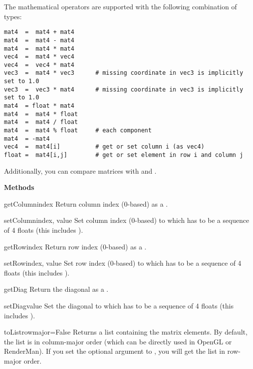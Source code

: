 The mathematical operators are supported with the following
combination of types:

\begin{verbatim}
mat4  =  mat4 + mat4
mat4  =  mat4 - mat4
mat4  =  mat4 * mat4
vec4  =  mat4 * vec4
vec4  =  vec4 * mat4
vec3  =  mat4 * vec3      # missing coordinate in vec3 is implicitly set to 1.0
vec3  =  vec3 * mat4      # missing coordinate in vec3 is implicitly set to 1.0
mat4  = float * mat4
mat4  =  mat4 * float
mat4  =  mat4 / float
mat4  =  mat4 % float     # each component
mat4  = -mat4
vec4  =  mat4[i]          # get or set column i (as vec4)
float =  mat4[i,j]        # get or set element in row i and column j
\end{verbatim}

Additionally, you can compare matrices with \code{==} and \code{!=}.

{\bf Methods}

\begin{methoddesc}{getColumn}{index}
Return column index (0-based) as a .
\end{methoddesc}

\begin{methoddesc}{setColumn}{index, value}
Set column index (0-based) to  which has to be a sequence
of 4 floats (this includes ).
\end{methoddesc}

\begin{methoddesc}{getRow}{index}
Return row index (0-based) as a .
\end{methoddesc}

\begin{methoddesc}{setRow}{index, value}
Set row index (0-based) to  which has to be a sequence of
4 floats (this includes ).
\end{methoddesc}

\begin{methoddesc}{getDiag}{}
Return the diagonal as a .
\end{methoddesc}

\begin{methoddesc}{setDiag}{value}
Set the diagonal to  which has to be a sequence of
4 floats (this includes ).
\end{methoddesc}

\begin{methoddesc}{toList}{rowmajor=False}
Returns a list containing the matrix elements. By default, the list is
in column-major order (which can be directly used in OpenGL or RenderMan). 
If you set the optional argument  to
, you will get the list in row-major order.
\end{methoddesc}

